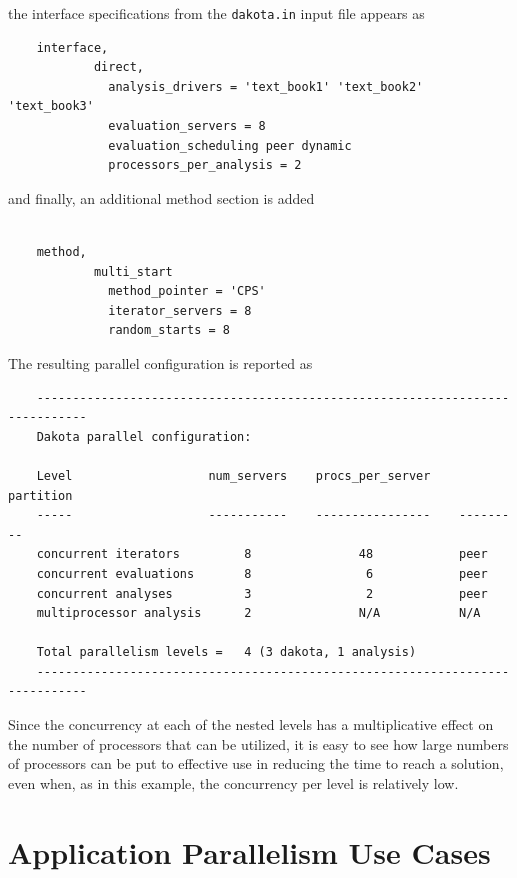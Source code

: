 the interface specifications from the
\texttt{dakota.in} input file appears as
\begin{small}
\begin{verbatim}
    interface,
            direct,
              analysis_drivers = 'text_book1' 'text_book2' 'text_book3'
              evaluation_servers = 8
              evaluation_scheduling peer dynamic
              processors_per_analysis = 2
\end{verbatim}
\end{small}

and finally, an additional method section is added
\begin{small}
\begin{verbatim}

    method,
            multi_start
              method_pointer = 'CPS'
              iterator_servers = 8
              random_starts = 8
\end{verbatim}
\end{small}

The resulting parallel configuration is reported as
\begin{small}
\begin{verbatim}
    -----------------------------------------------------------------------------
    Dakota parallel configuration:

    Level                   num_servers    procs_per_server    partition
    -----                   -----------    ----------------    ---------
    concurrent iterators         8               48            peer
    concurrent evaluations       8                6            peer
    concurrent analyses          3                2            peer
    multiprocessor analysis      2               N/A           N/A

    Total parallelism levels =   4 (3 dakota, 1 analysis)
    -----------------------------------------------------------------------------
\end{verbatim}
\end{small}

Since the concurrency at each of the nested levels has a
multiplicative effect on the number of processors that can be
utilized, it is easy to see how large numbers of processors can be put
to effective use in reducing the time to reach a solution, even when,
as in this example, the concurrency per level is relatively low.


\section{Application Parallelism Use Cases}\label{parallel:application}

